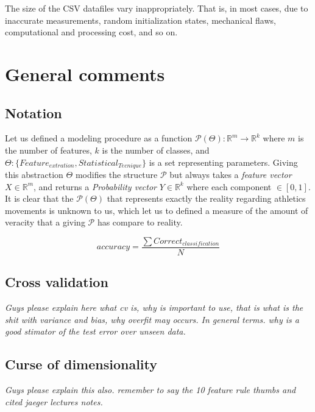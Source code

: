 The size of the CSV datafiles vary inappropriately. That is, in most cases, due to inaccurate measurements,
random initialization states, mechanical flaws, computational and processing cost, and so on.


\section{General comments}

\subsection{Notation}
Let us defined a modeling procedure as  a function $\mathcal{P}(\Theta): \mathbb{R}^{m} \longrightarrow \mathbb{R}^{k}$ where $m$ is the number of features, $k$ is the number of classes, and $\Theta : \{ Feature_{extration}, Statistical_{Tecnique} \}$ is a set representing parameters. Giving this abstraction $\Theta$ modifies the structure  $\mathcal{P}$ but always takes a \textit{feature vector} $X \in  \mathbb{R}^{m}$, and returns a \textit{Probability vector} $Y \in  \mathbb{R}^{k}$ where each component $\in  [0,1]$.\\

It is clear that the $\mathcal{P}(\Theta)$ that represents exactly the reality regarding athletics movements is unknown to us, which let us to defined a measure of the amount of veracity that a giving $\mathcal{P}$ has compare to reality. 

\begin{equation}
accuracy=  \frac{\sum Correct_{classification}}{N}
\end{equation}

\subsection{Cross validation}

\textit{Guys please explain here what cv is, why is important to use, that is what is the shit with variance and bias, why overfit may occurs. In general terms. why is a good stimator of the test error over unseen data.}

\subsection{Curse of dimensionality}

\textit{Guys please explain this also. remember to say the 10 feature rule thumbs and cited jaeger lectures notes.}


